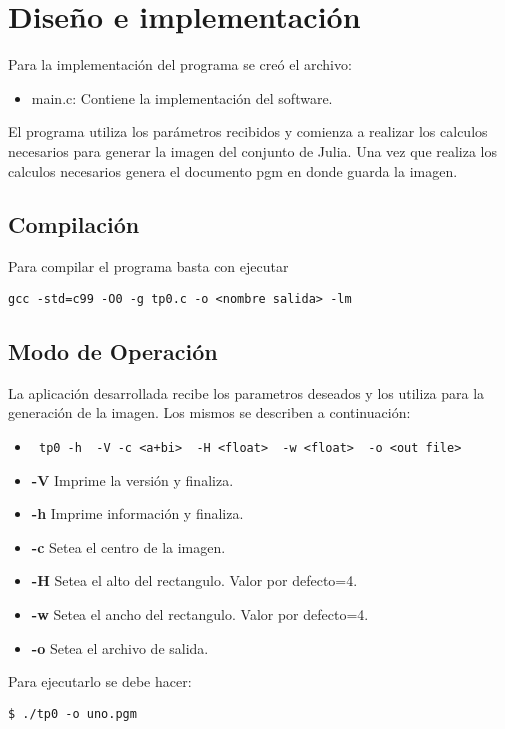 		
\section{Diseño e implementación}
Para la implementación del programa se creó el archivo:
\begin{itemize}
	\item main.c: Contiene la implementación del software.
\end{itemize}

El programa utiliza los parámetros recibidos y comienza a realizar los calculos necesarios para generar la imagen del conjunto de Julia. Una vez que realiza los
calculos necesarios genera el documento pgm en donde guarda la imagen.

\subsection{Compilación}
Para compilar el programa basta con ejecutar 

\bigskip	
\texttt{gcc -std=c99 -O0 -g tp0.c -o <nombre salida> -lm}


\subsection{Modo de Operación}
		La aplicación desarrollada recibe los parametros deseados y los utiliza para la generación de la imagen. Los mismos se describen a continuación:
		
		\begin{itemize}
			\item \begin{verbatim} tp0 -h  -V -c <a+bi>  -H <float>  -w <float>  -o <out file> \end{verbatim}
			\item \textbf{-V} Imprime la versión y finaliza.
			\item \textbf{-h} Imprime información y finaliza.
			\item \textbf{-c} Setea el centro de la imagen.
			\item \textbf{-H} Setea el alto del rectangulo. Valor por defecto=4.
			\item \textbf{-w} Setea el ancho del rectangulo. Valor por defecto=4.
			\item \textbf{-o} Setea el archivo de salida.
		\end{itemize}


		 \bigskip
Para ejecutarlo se debe hacer:

\bigskip
\texttt{\$ ./tp0 -o uno.pgm }

